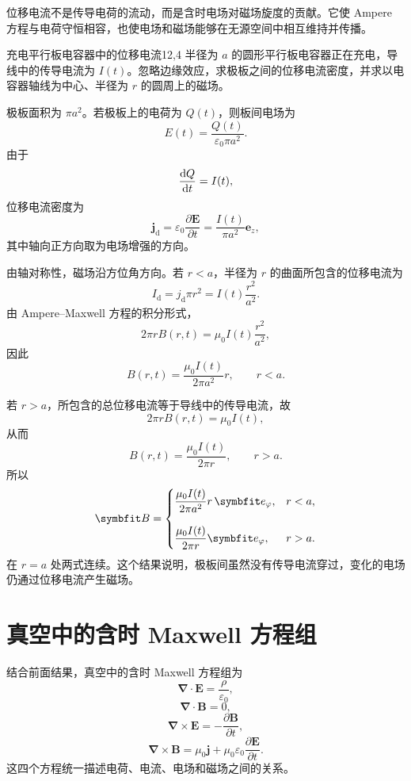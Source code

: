 位移电流不是传导电荷的流动，而是含时电场对磁场旋度的贡献。它使 Ampere 方程与电荷守恒相容，也使电场和磁场能够在无源空间中相互维持并传播。

\begin{example}{充电平行板电容器中的位移电流}{12,4}
半径为 $a$ 的圆形平行板电容器正在充电，导线中的传导电流为 $I(t)$。忽略边缘效应，求极板之间的位移电流密度，并求以电容器轴线为中心、半径为 $r$ 的圆周上的磁场。

\begin{solution}
极板面积为 $\pi a^{2}$。若极板上的电荷为 $Q(t)$，则板间电场为
\[
E(t)
=
\frac{Q(t)}{\varepsilon_{0}\pi a^{2}}.
\]
由于
\[
\frac{\mathop{}\!\mathrm{d} Q}{\mathop{}\!\mathrm{d} t}=I(t),
\]
位移电流密度为
\[
\bm{j}_{\mathrm{d}}
=
\varepsilon_{0}\frac{\partial\bm{E}}{\partial t}
=
\frac{I(t)}{\pi a^{2}}\bm{e}_{z},
\]
其中轴向正方向取为电场增强的方向。

由轴对称性，磁场沿方位角方向。若 $r<a$，半径为 $r$ 的曲面所包含的位移电流为
\[
I_{\mathrm{d}}
=
j_{\mathrm{d}}\pi r^{2}
=
I(t)\frac{r^{2}}{a^{2}}.
\]
由 Ampere--Maxwell 方程的积分形式，
\[
2\pi rB(r,t)
=
\mu_{0}I(t)\frac{r^{2}}{a^{2}},
\]
因此
\[
B(r,t)
=
\frac{\mu_{0}I(t)}{2\pi a^{2}}r,
\qquad
r<a.
\]

若 $r>a$，所包含的总位移电流等于导线中的传导电流，故
\[
2\pi rB(r,t)=\mu_{0}I(t),
\]
从而
\[
B(r,t)
=
\frac{\mu_{0}I(t)}{2\pi r},
\qquad
r>a.
\]
所以
\[
\bm{B}
=
\begin{dcases}
\dfrac{\mu_{0}I(t)}{2\pi a^{2}}r\,\bm{e}_{\varphi},
& r<a,\\[8pt]
\dfrac{\mu_{0}I(t)}{2\pi r}\bm{e}_{\varphi},
& r>a.
\end{dcases}
\]
在 $r=a$ 处两式连续。这个结果说明，极板间虽然没有传导电流穿过，变化的电场仍通过位移电流产生磁场。
\end{solution}
\end{example}

\section{真空中的含时 Maxwell 方程组}

结合前面结果，真空中的含时 Maxwell 方程组为
\begin{equation}
	\bm{\nabla}\cdot\bm{E}
	=
	\frac{\rho}{\varepsilon_{0}},
	\label{eq:12:maxwell-gauss-e}
\end{equation}
\begin{equation}
	\bm{\nabla}\cdot\bm{B}=0,
	\label{eq:12:maxwell-gauss-b}
\end{equation}
\begin{equation}
	\bm{\nabla}\times\bm{E}
	=
	-\frac{\partial\bm{B}}{\partial t},
	\label{eq:12:maxwell-faraday}
\end{equation}
\begin{equation}
	\bm{\nabla}\times\bm{B}
	=
	\mu_{0}\bm{j}
	+
	\mu_{0}\varepsilon_{0}
	\frac{\partial\bm{E}}{\partial t}.
	\label{eq:12:maxwell-ampere}
\end{equation}
这四个方程统一描述电荷、电流、电场和磁场之间的关系。

